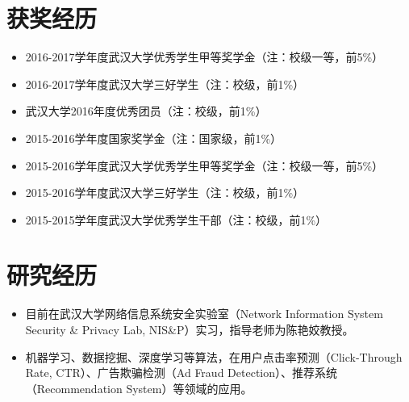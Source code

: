 \documentclass[letterpaper]{twentysecondcv} %
\begin{document}
\begin{CJK*}{UTF8}{gbsn}


\section{获奖经历}

\begin{itemize}
	\item 2016-2017学年度武汉大学优秀学生甲等奖学金（注：校级一等，前5\%）
	\item 2016-2017学年度武汉大学三好学生（注：校级，前1\%）
	\item 武汉大学2016年度优秀团员（注：校级，前1\%）
	\item 2015-2016学年度国家奖学金（注：国家级，前1\%）
	\item 2015-2016学年度武汉大学优秀学生甲等奖学金（注：校级一等，前5\%）
	\item 2015-2016学年度武汉大学三好学生（注：校级，前1\%）
	\item 2015-2015学年度武汉大学优秀学生干部（注：校级，前1\%）
\end{itemize}


\section{研究经历}


\begin{itemize}
	\item 目前在武汉大学网络信息系统安全实验室（Network Information System Security \& Privacy Lab, NIS\&P）实习，指导老师为陈艳姣教授。
	\item 机器学习、数据挖掘、深度学习等算法，在用户点击率预测（Click-Through Rate, CTR）、广告欺骗检测（Ad Fraud Detection）、推荐系统（Recommendation System）等领域的应用。
\end{itemize}


\end{CJK*}
\end{document}
